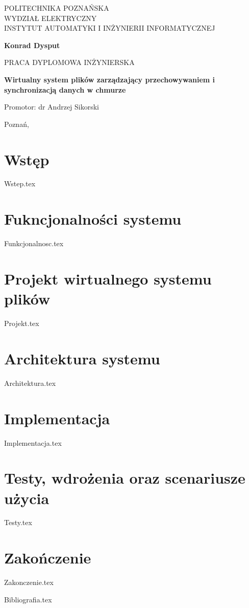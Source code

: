 \documentclass[12pt,a4paper,leqno,oneside,titlepage]{mwrep}
\begin{document}
\begin{titlepage}
\begin{center}
{\large POLITECHNIKA POZNAŃSKA\\ WYDZIAŁ ELEKTRYCZNY\\ INSTYTUT AUTOMATYKI I INŻYNIERII INFORMATYCZNEJ\par}
\end{center}
\vspace{1.5cm plus 1fill}
\begin{center}
{\bf \Large Konrad Dysput\par}
\end{center}
\vspace{1.5cm plus 1mm minus 2mm}
\begin{center}
{\large PRACA DYPLOMOWA INŻYNIERSKA\par}
\end{center}
\vspace{1.5cm plus 1mm minus 2mm}
\begin{center}
{\huge\textbf{Wirtualny system plików zarządzający przechowywaniem i synchronizacją danych w chmurze}\par}
\vspace{1.5cm plus 1.5fill}
\begin{flushright}
{\large Promotor: dr Andrzej Sikorski}
\end{flushright}
\vspace{4cm plus .1fill}
{\large Poznań,\par}
\end{center}
\end{titlepage}

\tableofcontents

\chapter{Wstęp}
{Wstep.tex}

\chapter{Fukncjonalności systemu}
{Funkcjonalnosc.tex}

\chapter{Projekt wirtualnego systemu plików}
{Projekt.tex}


\chapter{Architektura systemu}
{Architektura.tex}

\chapter{Implementacja}
{Implementacja.tex}

\chapter{Testy, wdrożenia oraz scenariusze użycia}
{Testy.tex}

\chapter{Zakończenie}
{Zakonczenie.tex}


{Bibliografia.tex}
\end{document}
